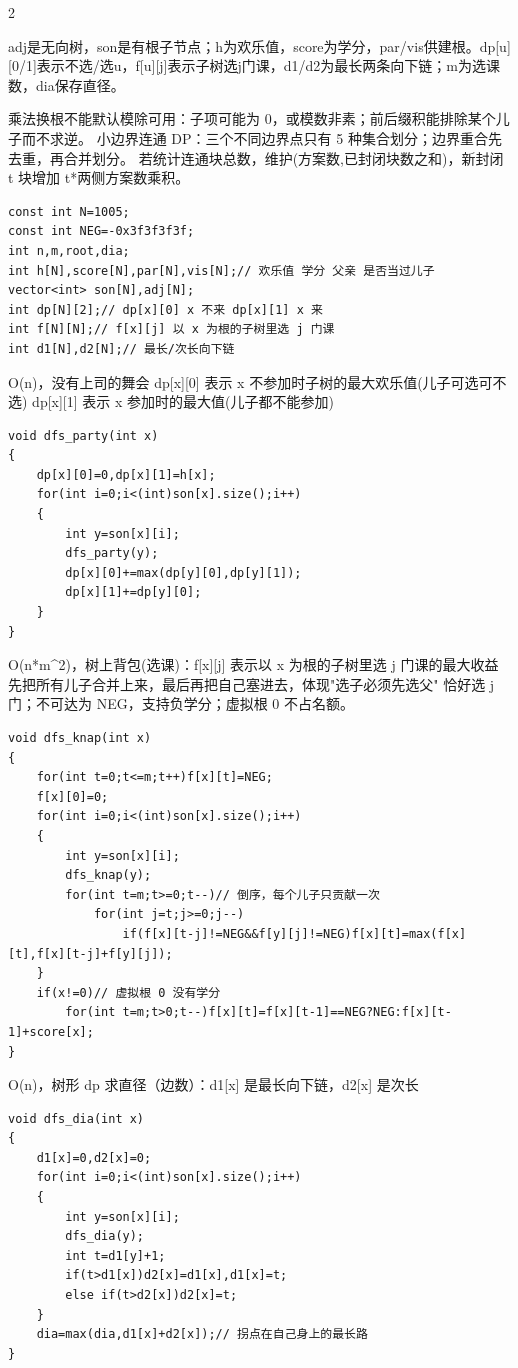 \documentclass[UTF8,fontset=fandol,a4paper,twoside]{ctexart}
\newcommand{\note}[1]{{\fontsize{10}{12}\selectfont #1\par}}
\begin{document}
\begin{multicols}{2}
\note{adj是无向树，son是有根子节点；h为欢乐值，score为学分，par/\allowbreak{}vis供建根。dp[\allowbreak{}u]\allowbreak{}[\allowbreak{}0/\allowbreak{}1]\allowbreak{}表示不选/\allowbreak{}选u，f[\allowbreak{}u]\allowbreak{}[\allowbreak{}j]\allowbreak{}表示子树选j门课，d1/\allowbreak{}d2为最长两条向下链；m为选课数，dia保存直径。}
\note{乘法换根不能默认模除可用：子项可能为 0，或模数非素；前后缀积能排除某个儿子而不求逆。 小边界连通 DP：三个不同边界点只有 5 种集合划分；边界重合先去重，再合并划分。 若统计连通块总数，维护(\allowbreak{}方案数,\allowbreak{}已封闭块数之和)\allowbreak{}，新封闭 t 块增加 t*两侧方案数乘积。}
\begin{lstlisting}
const int N=1005;
const int NEG=-0x3f3f3f3f;
int n,m,root,dia;
int h[N],score[N],par[N],vis[N];// 欢乐值 学分 父亲 是否当过儿子
vector<int> son[N],adj[N];
int dp[N][2];// dp[x][0] x 不来 dp[x][1] x 来
int f[N][N];// f[x][j] 以 x 为根的子树里选 j 门课
int d1[N],d2[N];// 最长/次长向下链
\end{lstlisting}
\note{O(\allowbreak{}n)\allowbreak{}，没有上司的舞会 dp[\allowbreak{}x]\allowbreak{}[\allowbreak{}0]\allowbreak{} 表示 x 不参加时子树的最大欢乐值(\allowbreak{}儿子可选可不选)\allowbreak{} dp[\allowbreak{}x]\allowbreak{}[\allowbreak{}1]\allowbreak{} 表示 x 参加时的最大值(\allowbreak{}儿子都不能参加)\allowbreak{}}
\begin{lstlisting}
void dfs_party(int x)
{
    dp[x][0]=0,dp[x][1]=h[x];
    for(int i=0;i<(int)son[x].size();i++)
    {
        int y=son[x][i];
        dfs_party(y);
        dp[x][0]+=max(dp[y][0],dp[y][1]);
        dp[x][1]+=dp[y][0];
    }
}
\end{lstlisting}
\note{O(\allowbreak{}n*m\textasciicircum{}2)\allowbreak{}，树上背包(\allowbreak{}选课)\allowbreak{}：f[\allowbreak{}x]\allowbreak{}[\allowbreak{}j]\allowbreak{} 表示以 x 为根的子树里选 j 门课的最大收益 先把所有儿子合并上来，最后再把自己塞进去，体现"选子必须先选父" 恰好选 j 门；不可达为 NEG，支持负学分；虚拟根 0 不占名额。}
\begin{lstlisting}
void dfs_knap(int x)
{
    for(int t=0;t<=m;t++)f[x][t]=NEG;
    f[x][0]=0;
    for(int i=0;i<(int)son[x].size();i++)
    {
        int y=son[x][i];
        dfs_knap(y);
        for(int t=m;t>=0;t--)// 倒序，每个儿子只贡献一次
            for(int j=t;j>=0;j--)
                if(f[x][t-j]!=NEG&&f[y][j]!=NEG)f[x][t]=max(f[x][t],f[x][t-j]+f[y][j]);
    }
    if(x!=0)// 虚拟根 0 没有学分
        for(int t=m;t>0;t--)f[x][t]=f[x][t-1]==NEG?NEG:f[x][t-1]+score[x];
}
\end{lstlisting}
\note{O(\allowbreak{}n)\allowbreak{}，树形 dp 求直径（边数）：d1[\allowbreak{}x]\allowbreak{} 是最长向下链，d2[\allowbreak{}x]\allowbreak{} 是次长}
\begin{lstlisting}
void dfs_dia(int x)
{
    d1[x]=0,d2[x]=0;
    for(int i=0;i<(int)son[x].size();i++)
    {
        int y=son[x][i];
        dfs_dia(y);
        int t=d1[y]+1;
        if(t>d1[x])d2[x]=d1[x],d1[x]=t;
        else if(t>d2[x])d2[x]=t;
    }
    dia=max(dia,d1[x]+d2[x]);// 拐点在自己身上的最长路
}
\end{lstlisting}

\end{multicols}
\end{document}
